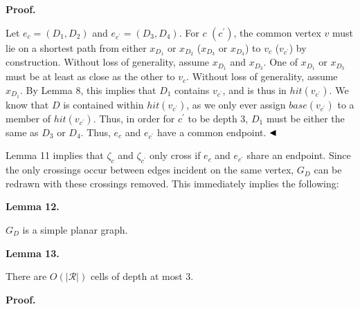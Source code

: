\par
\par
\par
\par\medskip\noindent\textbf{Proof.}\par
Let $e_{c}=(D_{1},D_{2})$ and $e_{c^{\prime}}=(D_{3},D_{4})$. For $c$ $(c^{\prime})$, the common vertex $v$ must lie on a shortest path from either $x_{D_{1}}$ or $x_{D_{2}}$ ($x_{D_{3}}$ or $x_{D_{4}}$) to $v_{c}$ ($v_{c^{\prime}}$) by construction. Without loss of generality, assume $x_{D_{1}}$ and $x_{D_{3}}$. One of $x_{D_{1}}$ or $x_{D_{3}}$ must be at least as close as the other to $v_{c}$. Without loss of generality, assume $x_{D_{1}}$. By Lemma 8, this implies that $D_{1}$ contains $v_{c^{\prime}}$, and is thus in $\mathit{hit}(v_{c^{\prime}})$. We know that $D$ is contained within $\mathit{hit}(v_{c^{\prime}})$, as we only ever assign $\mathit{base}(v_{c^{\prime}})$ to a member of $\mathit{hit}(v_{c^{\prime}})$. Thus, in order for $c^{\prime}$ to be depth 3, $D_{1}$ must be either the same as $D_{3}$ or $D_{4}$. Thus, $e_{c}$ and $e_{c^{\prime}}$ have a common endpoint. $\hfill\blacktriangleleft$
\par
\par
Lemma 11 implies that $\zeta_{c}$ and $\zeta_{c^{\prime}}$ only cross if $e_{c}$ and $e_{c^{\prime}}$ share an endpoint. Since the only crossings occur between edges incident on the same vertex, $G_{D}$ can be redrawn with these crossings removed. This immediately implies the following:
\par
\par
\par\medskip\noindent\textbf{Lemma 12.}\par
$G_{D}$ is a simple planar graph.
\par
\par
\par
\par\medskip\noindent\textbf{Lemma 13.}\par
There are $O(|\mathcal{R}|)$ cells of depth at most 3.
\par
\par
\par
\par\medskip\noindent\textbf{Proof.}\par
